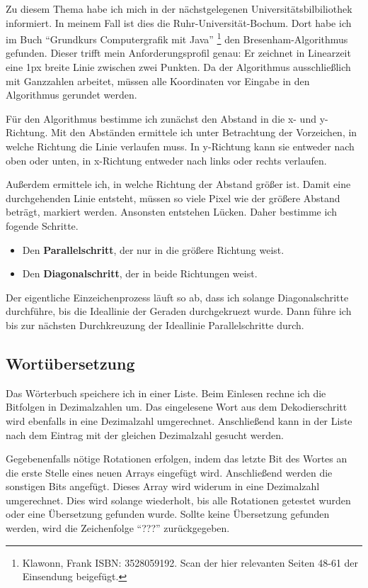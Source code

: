 Zu diesem Thema habe ich mich in der nächstgelegenen Universitätsbilbiliothek informiert. In meinem Fall ist dies die Ruhr-Universität-Bochum. Dort habe ich im Buch "`Grundkurs Computergrafik mit Java"' \footnote{Klawonn, Frank ISBN: 3528059192. Scan der hier relevanten Seiten 48-61 der Einsendung beigefügt.} den Bresenham-Algorithmus gefunden. Dieser trifft mein Anforderungsprofil genau: Er zeichnet in Linearzeit eine 1px breite Linie zwischen zwei Punkten. Da der Algorithmus ausschließlich mit Ganzzahlen arbeitet, müssen alle Koordinaten vor Eingabe in den Algorithmus gerundet werden.

Für den Algorithmus bestimme ich zunächst den Abstand in die x- und y-Richtung. Mit den Abständen ermittele ich unter Betrachtung der Vorzeichen, in welche Richtung die Linie verlaufen muss. In y-Richtung kann sie entweder nach oben oder unten, in x-Richtung entweder nach links oder rechts verlaufen.

Außerdem ermittele ich, in welche Richtung der Abstand größer ist.
Damit eine durchgehenden Linie entsteht, müssen so viele Pixel wie der größere Abstand beträgt, markiert werden. Ansonsten entstehen Lücken. Daher bestimme ich fogende Schritte.
\begin{itemize}
	\item Den \textbf{Parallelschritt}, der nur in die größere Richtung weist. 
	\item Den \textbf{Diagonalschritt}, der in beide Richtungen weist.
\end{itemize}

Der eigentliche Einzeichenprozess läuft so ab, dass ich solange Diagonalschritte durchführe, bis die Ideallinie der Geraden durchgekruezt wurde. Dann führe ich bis zur nächsten Durchkreuzung der Ideallinie Parallelschritte durch. 

\subsection{Wortübersetzung}
Das Wörterbuch speichere ich in einer Liste. Beim Einlesen rechne ich die Bitfolgen in Dezimalzahlen um.
Das eingelesene Wort aus dem Dekodierschritt wird ebenfalls in eine Dezimalzahl umgerechnet. Anschließend kann in der Liste nach dem Eintrag mit der gleichen Dezimalzahl gesucht werden.

Gegebenenfalls nötige Rotationen erfolgen, indem das letzte Bit des Wortes an die erste Stelle eines neuen Arrays eingefügt wird. Anschließend werden die sonstigen Bits angefügt.
Dieses Array wird widerum in eine Dezimalzahl umgerechnet. Dies wird solange wiederholt, bis alle Rotationen getestet wurden oder eine Übersetzung gefunden wurde.
Sollte keine Übersetzung gefunden werden, wird die Zeichenfolge "`???"' zurückgegeben. 

